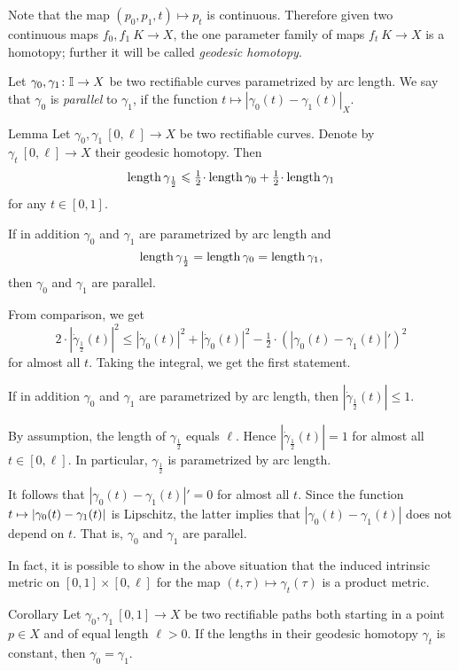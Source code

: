 \documentclass{article}
\begin{document}
Note that the map $(p_0,p_1,t)\mapsto p_t$ is continuous.
Therefore given two continuous maps $f_0,f_1\:K\to X$,
the one parameter family of maps $f_t\:K\to X$ is a homotopy;
further it will be called \emph{geodesic homotopy}.

Let $\gamma_{0}, \gamma_1\colon\mathbb{I}\to X$ be two rectifiable curves parametrized by arc length. 
We say that  $\gamma_{0}$ is {\em parallel} to $\gamma_{1}$, if the function $t\mapsto |\gamma_{0}(t)-\gamma_{1}(t)|_X$.


\begin{thm}{Lemma}\label{lem:parpaths}
Let $\gamma_0,\gamma_1\:[0,\ell]\to X$ be two rectifiable curves. 
Denote by $\gamma_t\:[0,\ell]\to X$ their geodesic homotopy.
Then
\[\length\gamma_{\frac12}
\le \tfrac12\cdot\length\gamma_0 +\tfrac12\cdot\length\gamma_1\]
for any $t\in [0,1]$.

If in addition $\gamma_0$ and $\gamma_1$ are parametrized by arc length and 
\[\mathop{\rm length}\nolimits\gamma_{\frac12}
=\mathop{\rm length}\nolimits\gamma_0
=\mathop{\rm length}\nolimits\gamma_1,\] 
then $\gamma_{0}$ and $\gamma_{1}$ are parallel. 
\end{thm}

From comparison, we get
\[2\cdot|\dot\gamma_{\frac12}(t)|^2
\le
|\dot\gamma_{0}(t)|^2
+|\dot\gamma_{0}(t)|^2
-\tfrac12\cdot(|\gamma_{0}(t)-\gamma_{1}(t)|')^2\] 
for almost all $t$.
Taking the integral, we get the first statement.

If in addition $\gamma_0$ and $\gamma_1$ are parametrized by arc length, 
then $|\dot\gamma_{\frac12}(t)|\le 1$.

By assumption, the length of $\gamma_{\frac12}$ equals $\ell$. 
Hence $|\dot\gamma_{\frac12}(t)|=1$ for almost all $t\in[0,\ell]$. 
In particular, $\gamma_{\frac12}$
is parametrized by arc length. 

It follows that $|\gamma_{0}(t)-\gamma_{1}(t)|'=0$ for almost all $t$.
Since the function $t\zz\mapsto |\gamma_{0}(t)-\gamma_{1}(t)|$ is Lipschitz,
the latter  implies that $|\gamma_{0}(t)-\gamma_{1}(t)|$ does not depend on $t$.
That is, $\gamma_{0}$ and $\gamma_{1}$ are parallel.
\qeds

In fact, it is possible to show in the above situation that the induced intrinsic metric on $[0,1]\times[0,\ell]$
for the map $(t,\tau)\mapsto \gamma_t(\tau)$ is a product metric.

\begin{thm}{Corollary}\label{cor:parpaths}
Let $\gamma_0,\gamma_1\:[0,1]\to X$ be two rectifiable paths both starting in a point $p\in X$ and of equal length $\ell>0$. 
If the lengths in their geodesic homotopy $\gamma_t$ is constant, then $\gamma_{0}=\gamma_{1}$.
\end{thm}
\end{document}
